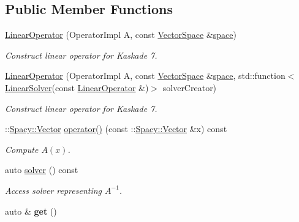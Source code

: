 \subsection*{Public Member Functions}
\begin{DoxyCompactItemize}
\item 
\hyperlink{classSpacy_1_1Kaskade_1_1LinearOperator_a24acb8f5c16194484d4afe5777a5aea5}{Linear\+Operator} (Operator\+Impl A, const \hyperlink{classSpacy_1_1VectorSpace}{Vector\+Space} \&\hyperlink{classSpacy_1_1VectorBase_aa999dbf9d679d895dfe04c10fbf9f5e9}{space})
\begin{DoxyCompactList}\small\item\em Construct linear operator for Kaskade 7. \end{DoxyCompactList}\item 
\hyperlink{classSpacy_1_1Kaskade_1_1LinearOperator_a5c287f9cae480a07428e49af70875b7a}{Linear\+Operator} (Operator\+Impl A, const \hyperlink{classSpacy_1_1VectorSpace}{Vector\+Space} \&\hyperlink{classSpacy_1_1VectorBase_aa999dbf9d679d895dfe04c10fbf9f5e9}{space}, std\+::function$<$ \hyperlink{namespaceSpacy_a4cd614ddb41dd29e68a723dadd5602f2}{Linear\+Solver}(const \hyperlink{classSpacy_1_1Kaskade_1_1LinearOperator}{Linear\+Operator} \&)$>$ solver\+Creator)
\begin{DoxyCompactList}\small\item\em Construct linear operator for Kaskade 7. \end{DoxyCompactList}\item 
\hypertarget{classSpacy_1_1Kaskade_1_1LinearOperator_added0f85104ded29f4c87992f5b5a81b}{}\+::\hyperlink{classSpacy_1_1Vector}{Spacy\+::\+Vector} \hyperlink{classSpacy_1_1Kaskade_1_1LinearOperator_added0f85104ded29f4c87992f5b5a81b}{operator()} (const \+::\hyperlink{classSpacy_1_1Vector}{Spacy\+::\+Vector} \&x) const \label{classSpacy_1_1Kaskade_1_1LinearOperator_added0f85104ded29f4c87992f5b5a81b}

\begin{DoxyCompactList}\small\item\em Compute $A(x)$. \end{DoxyCompactList}\item 
\hypertarget{classSpacy_1_1Kaskade_1_1LinearOperator_a843c904f87af508090604adc28488e91}{}auto \hyperlink{classSpacy_1_1Kaskade_1_1LinearOperator_a843c904f87af508090604adc28488e91}{solver} () const \label{classSpacy_1_1Kaskade_1_1LinearOperator_a843c904f87af508090604adc28488e91}

\begin{DoxyCompactList}\small\item\em Access solver representing $A^{-1}$. \end{DoxyCompactList}\item 
\hypertarget{classSpacy_1_1Kaskade_1_1LinearOperator_aeb463955039d370fc09effff0179ce41}{}auto \& {\bfseries get} ()\label{classSpacy_1_1Kaskade_1_1LinearOperator_aeb463955039d370fc09effff0179ce41}


\end{DoxyCompactItemize}
